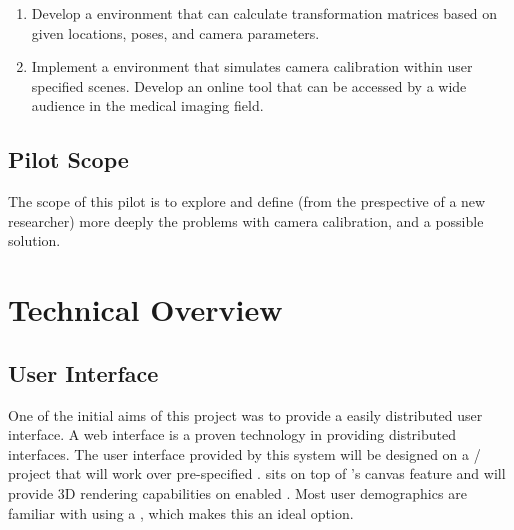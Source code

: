 \documentclass[11pt]{report}
\begin{document}
\begin{enumerate}
\item Develop a  environment that can calculate transformation matrices based on given locations, poses, and camera parameters.  
\item Implement a  environment that simulates camera calibration within user specified scenes. Develop an online tool that can be accessed by a wide audience in the medical imaging field.
\end{enumerate}

\subsection{Pilot Scope}
The scope of this pilot is to explore and define (from the prespective of a new researcher) more deeply the problems with camera calibration, and a possible solution.  

\section{Technical Overview}

\subsection{User Interface}




One of the initial aims of this project was to provide a easily distributed user interface. A web interface is a proven technology in providing distributed interfaces. The user interface provided by this system will be designed on a / project that will work over pre-specified .  sits on top of 's canvas feature and will provide 3D rendering capabilities on enabled . Most user demographics are familiar with using a , which makes this an ideal option. 
\end{document}
